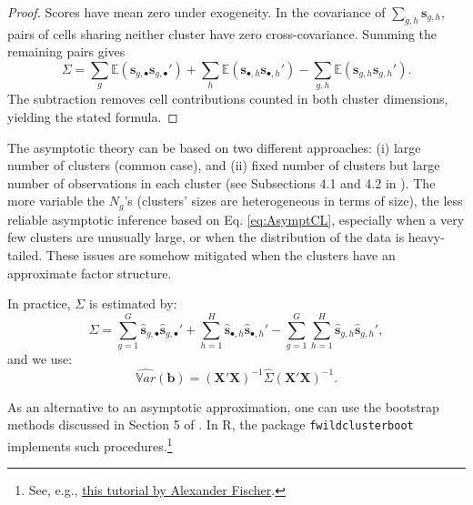 \documentclass[
  11pt,
]{book}
\theoremstyle{definition}
\theoremstyle{definition}
\theoremstyle{definition}
\theoremstyle{definition}
\theoremstyle{remark}
\begin{document}
\begin{proof}
Scores have mean zero under exogeneity. In the covariance of \(\sum_{g,h}\mathbf{s}_{g,h}\), pairs of cells sharing neither cluster have zero cross-covariance. Summing the remaining pairs gives
\[
\Sigma=\sum_g\mathbb E(\mathbf{s}_{g,\bullet}\mathbf{s}_{g,\bullet}')+
\sum_h\mathbb E(\mathbf{s}_{\bullet,h}\mathbf{s}_{\bullet,h}')-
\sum_{g,h}\mathbb E(\mathbf{s}_{g,h}\mathbf{s}_{g,h}').
\]
The subtraction removes cell contributions counted in both cluster dimensions, yielding the stated formula.
\end{proof}

The asymptotic theory can be based on two different approaches: (i) large number of clusters (common case), and (ii) fixed number of clusters but large number of observations in each cluster (see Subsections 4.1 and 4.2 in \citet{MACKINNON2022}). The more variable the \(N_g\)'s (clusters' sizes are heterogeneous in terms of size), the less reliable asymptotic inference based on Eq. \eqref{eq:AsymptCL}, especially when a very few clusters are unusually large, or when the distribution of the data is heavy-tailed. These issues are somehow mitigated when the clusters have an approximate factor structure.

In practice, \(\Sigma\) is estimated by:
\[
\widehat{\Sigma} = \sum_{g=1}^G \widehat{\mathbf{s}}_{g,\bullet}\widehat{\mathbf{s}}_{g,\bullet}' + \sum_{h=1}^H \widehat{\mathbf{s}}_{\bullet,h}\widehat{\mathbf{s}}_{\bullet,h}' - \sum_{g=1}^G\sum_{h=1}^H \widehat{\mathbf{s}}_{g,h}\widehat{\mathbf{s}}_{g,h}',
\]
and we use:
\[
\widehat{\mathbb{V}ar}(\mathbf{b}) = \left(\mathbf{X}'\mathbf{X}\right)^{-1}\widehat{\Sigma}\left(\mathbf{X}'\mathbf{X}\right)^{-1}.
\]

As an alternative to an asymptotic approximation, one can use the bootstrap methods discussed in Section 5 of \citet{MACKINNON2022}. In R, the package \texttt{fwildclusterboot} implements such procedures.\footnote{See, e.g., \href{https://cran.r-project.org/web/packages/fwildclusterboot/vignettes/fwildclusterboot.html}{this tutorial by Alexander Fischer}.}
\end{document}

